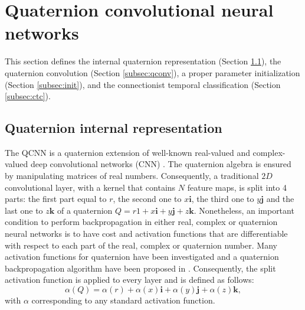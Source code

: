 \documentclass[a4paper]{article}
\def\i{\textbf{i}}
\def\j{\textbf{j}}
\begin{document}


\section{Quaternion convolutional neural networks}
\label{sec:QCNN}

This section defines the internal quaternion representation (Section \ref{subsec:qinternal}), the quaternion convolution (Section \ref{subsec:qconv}), a proper parameter initialization (Section \ref{subsec:init}), and the connectionist temporal classification (Section \ref{subsec:ctc}).

\subsection{Quaternion internal representation}
\label{subsec:qinternal}
The QCNN is a quaternion extension of well-known real-valued and complex-valued deep convolutional networks (CNN) \cite{he2016deep,chiheb2017complex}. The quaternion algebra is ensured by manipulating matrices of real numbers. Consequently, a traditional $2D$ convolutional layer, with a kernel that contains $N$ feature maps, is split into 4 parts: the first part equal to $r$, the second one to $x\i$, the third one to $y\j$ and the last one to $z\textbf{k}$ of a quaternion $Q = r1+x\i+y\j+z\textbf{k}$. Nonetheless, an important condition to perform backpropagation in either real, complex or quaternion neural networks is to have cost and activation functions that are differentiable with respect to each part of the real, complex or quaternion number. Many activation functions for quaternion have been investigated \cite{xu2017learning} and a quaternion backpropagation algorithm have been proposed in \cite{nitta1995quaternary}. Consequently, the split activation \cite{arena1994neural,parcollet2016quaternion} function is applied to every layer and is defined as follows:
\begin{equation}
\alpha(Q)=\alpha(r)+\alpha(x)\i+\alpha(y)\j+\alpha(z)\textbf{k},
\end{equation}
with $\alpha$ corresponding to any standard activation function.
\end{document}
